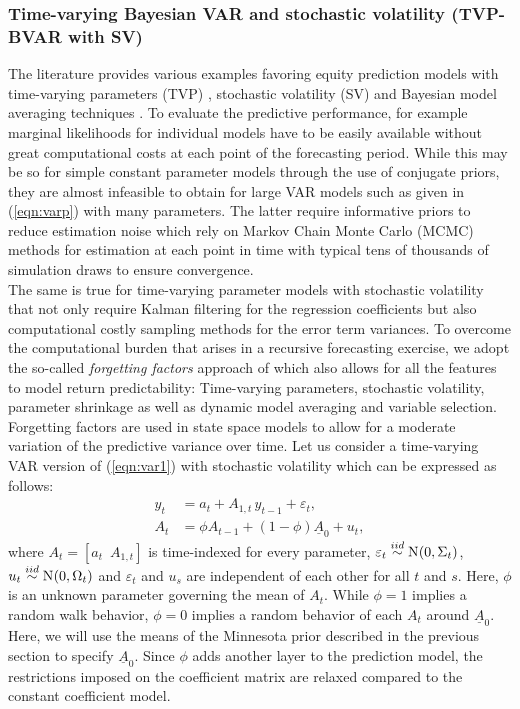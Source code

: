 \subsubsection{Time-varying Bayesian VAR and stochastic volatility (TVP-BVAR with SV)}\label{subsubsec:tvp}
The literature provides various examples favoring equity prediction models with time-varying parameters (TVP) \citep{dangl2012}, stochastic volatility (SV) \citep{johannes2014} and Bayesian model averaging techniques \citep{pettenuzzo2016}. To evaluate the predictive performance, for example marginal likelihoods for individual models have to be easily available without great computational costs at each point of the forecasting period. While this may be so for simple constant parameter models through the use of conjugate priors, they are almost infeasible to obtain for large VAR models such as given in (\ref{eqn:varp}) with many parameters. The latter require informative priors to reduce estimation noise which rely on Markov Chain Monte Carlo (MCMC) methods for estimation at each point in time  with typical tens of thousands of simulation draws to ensure convergence.\\ 
%
\indent The same is true for time-varying parameter models with stochastic volatility that not only require Kalman filtering for the regression coefficients but also computational costly sampling methods for the error term variances. To overcome the computational burden that arises in a recursive forecasting exercise, we adopt the so-called \textit{forgetting factors} approach of \cite{koop2013} which also allows for all the features to model return predictability: Time-varying parameters, stochastic volatility, parameter shrinkage as well as dynamic model averaging and variable selection. Forgetting factors are used in state space models to allow for a moderate variation of the predictive variance over time. Let us consider a time-varying VAR version of (\ref{eqn:var1}) with stochastic volatility which can be expressed as follows:
\begin{align}\label{eqn:tvpvar1}
y_t&=a_t+A_{1,t}\,y_{t-1}+\varepsilon_t,\\
A_t&=\phi A_{t-1}+(1-\phi)\underline{A}_0+u_t,\label{eqn:tvpvar2}
\end{align}
where $A_t=[a_t\,\,\, A_{1,t}]$ is time-indexed for every parameter, $\varepsilon_t\stackrel{iid}{\sim}\No{0,\Sigma_t}$, $u_t\stackrel{iid}{\sim}\No{0,\Omega_t}$ and $\varepsilon_t$ and $u_s$ are independent of each other for all $t$ and $s$. Here, $\phi$ is an unknown parameter governing the mean of $A_t$. While $\phi=1$ implies a random walk behavior, $\phi=0$ implies a random behavior of each $A_t$ around $\underline{A}_0$. Here, we will use the means of the Minnesota prior described in the previous section to specify $\underline{A}_0$. Since $\phi$ adds another layer to the prediction model, the restrictions imposed on the coefficient matrix are relaxed compared to the constant coefficient model.\\
